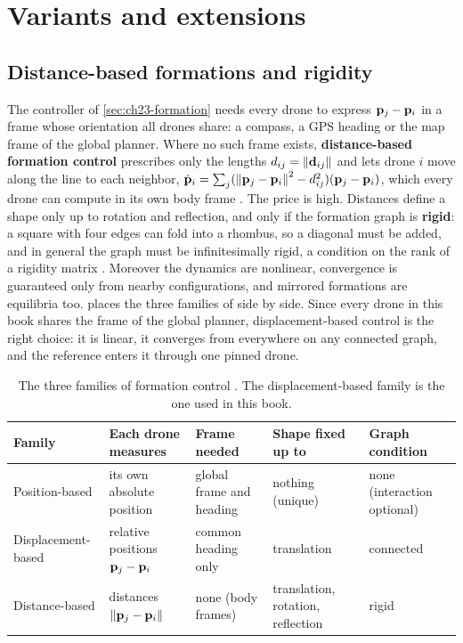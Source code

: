 \section{Variants and extensions}
\label{sec:ch23-variants}

\subsection{Distance-based formations and rigidity}
\label{sec:ch23-distance}

The controller of \cref{sec:ch23-formation} needs every drone to express
$\mathbf{p}_j - \mathbf{p}_i$ in a frame whose orientation all drones share: a compass, a
GPS heading or the map frame of the global planner. Where no such frame
exists, \textbf{distance-based formation control}
prescribes only the lengths $d_{ij} = \left\lVert \mathbf{d}_{ij} \right\rVert$ and lets drone $i$
move along the line to each neighbor, $\dot{\mathbf{p}}_i = \sum_j
(\left\lVert \mathbf{p}_j - \mathbf{p}_i \right\rVert^2 - d_{ij}^2)(\mathbf{p}_j - \mathbf{p}_i)$, which every drone can
compute in its own body frame \cite{krick2009stabilisation,oh2015survey}. The
price is high. Distances define a shape only up to rotation and reflection,
and only if the formation graph is \textbf{rigid}: a square
with four edges can fold into a rhombus, so a diagonal must be added, and in
general the graph must be infinitesimally rigid, a condition on the rank of a
rigidity matrix \cite{anderson2008rigid}. Moreover the dynamics are nonlinear,
convergence is guaranteed only from nearby configurations, and mirrored
formations are equilibria too.  places the three
families of \textcite{oh2015survey} side by side. Since every drone in this
book shares the frame of the global planner, displacement-based control is the
right choice: it is linear, it converges from everywhere on any connected
graph, and the \cbs reference enters it through one pinned drone.

\begin{table}[tb]
  \centering\small
  \caption{The three families of formation control \cite{oh2015survey}. The
  displacement-based family is the one used in this book.}
  \label{tab:ch23-families}
  \begin{tabular}{@{}lL{3.0cm}L{2.6cm}L{2.6cm}L{2.6cm}@{}}
  \toprule
  Family & Each drone measures & Frame needed & Shape fixed up to & Graph condition\\
  \midrule
  Position-based & its own absolute position & global frame and heading & nothing (unique) & none (interaction optional)\\
  Displacement-based & relative positions $\mathbf{p}_j - \mathbf{p}_i$ & common heading only & translation & connected\\
  Distance-based & distances $\left\lVert \mathbf{p}_j - \mathbf{p}_i \right\rVert$ & none (body frames) & translation, rotation, reflection & rigid\\
  \bottomrule
  \end{tabular}
\end{table}

